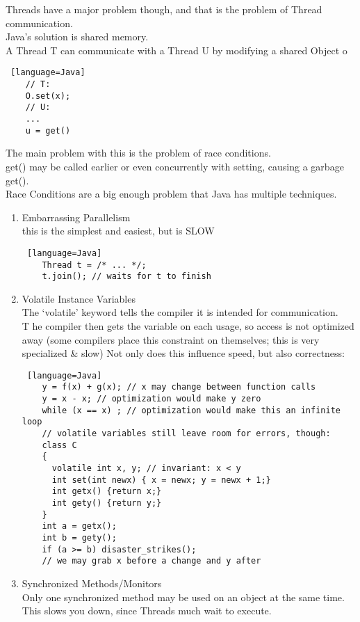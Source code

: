 \documentclass[../../lecture_notes.tex]{subfiles}
\begin{document}
\noindent Threads have a major problem though, and that is the problem of Thread communication.\\
Java’s solution is shared memory.\\
 A Thread T can communicate with a Thread U by modifying a shared Object o
 \begin{lstlisting} [language=Java]
	// T:
	O.set(x);
	// U:
	... 
	u = get()		
\end{lstlisting}
\noindent The main problem with this is the problem of race conditions.\\
get() may be called earlier or even concurrently with setting, causing a garbage get().\\
Race Conditions are a big enough problem that Java has multiple techniques.
\begin{enumerate} [itemsep=0mm]
	\item Embarrassing Parallelism\\
		this is the simplest and easiest, but is SLOW
		\begin{lstlisting} [language=Java]
	Thread t = /* ... */;
	t.join(); // waits for t to finish
		\end{lstlisting}
	\item Volatile Instance Variables\\
		The ‘volatile’ keyword tells the compiler it is intended for communication.\\
		T he compiler then gets the variable on each usage, so access is not optimized away
		(some compilers place this constraint on themselves; this is very specialized \& slow)
		Not only does this influence speed, but also correctness:
		\begin{lstlisting} [language=Java]
	y = f(x) + g(x); // x may change between function calls
	y = x - x; // optimization would make y zero
	while (x == x) ; // optimization would make this an infinite loop
	// volatile variables still leave room for errors, though:
	class C
	{
	  volatile int x, y; // invariant: x < y
	  int set(int newx) { x = newx; y = newx + 1;}
	  int getx() {return x;}
	  int gety() {return y;}
	}
	int a = getx();
	int b = gety();
	if (a >= b) disaster_strikes(); 
	// we may grab x before a change and y after
		\end{lstlisting}
	\item Synchronized Methods/Monitors\\
		Only one synchronized method may be used on an object at the same time.\\
		This slows you down, since Threads much wait to execute.\\

\end{enumerate}
\end{document}

